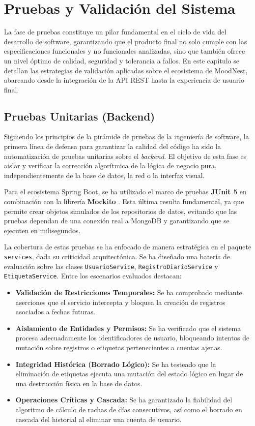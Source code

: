\newpage
\section{Pruebas y Validación del Sistema}

La fase de pruebas constituye un pilar fundamental en el ciclo de vida del desarrollo de software, garantizando que el producto final no solo cumple con las especificaciones funcionales y no funcionales analizadas, sino que también ofrece un nivel óptimo de calidad, seguridad y tolerancia a fallos. En este capítulo se detallan las estrategias de validación aplicadas sobre el ecosistema de MoodNest, abarcando desde la integración de la API REST hasta la experiencia de usuario final.

\subsection{Pruebas Unitarias (Backend)}

Siguiendo los principios de la pirámide de pruebas de la ingeniería de software, la primera línea de defensa para garantizar la calidad del código ha sido la automatización de pruebas unitarias sobre el \textit{backend}. El objetivo de esta fase es aislar y verificar la corrección algorítmica de la lógica de negocio pura, independientemente de la base de datos, la red o la interfaz visual.

Para el ecosistema Spring Boot, se ha utilizado el marco de pruebas \textbf{JUnit 5} \cite{bib:junit} en combinación con la librería \textbf{Mockito} \cite{bib:mockito}. Esta última resulta fundamental, ya que permite crear objetos simulados de los repositorios de datos, evitando que las pruebas dependan de una conexión real a MongoDB y garantizando que se ejecuten en milisegundos.

La cobertura de estas pruebas se ha enfocado de manera estratégica en el paquete \texttt{services}, dada su criticidad arquitectónica. Se ha diseñado una batería de evaluación sobre las clases \texttt{UsuarioService}, \texttt{RegistroDiarioService} y \texttt{EtiquetaService}. Entre los escenarios evaluados destacan:
\begin{itemize}
    \item \textbf{Validación de Restricciones Temporales:} Se ha comprobado mediante aserciones que el servicio intercepta y bloquea la creación de registros asociados a fechas futuras.
    \item \textbf{Aislamiento de Entidades y Permisos:} Se ha verificado que el sistema procesa adecuadamente los identificadores de usuario, bloqueando intentos de mutación sobre registros o etiquetas pertenecientes a cuentas ajenas.
    \item \textbf{Integridad Histórica (Borrado Lógico):} Se ha testeado que la eliminación de etiquetas ejecuta una mutación del estado lógico en lugar de una destrucción física en la base de datos.
    \item \textbf{Operaciones Críticas y Cascada:} Se ha garantizado la fiabilidad del algoritmo de cálculo de rachas de días consecutivos, así como el borrado en cascada del historial al eliminar una cuenta de usuario.
\end{itemize}

